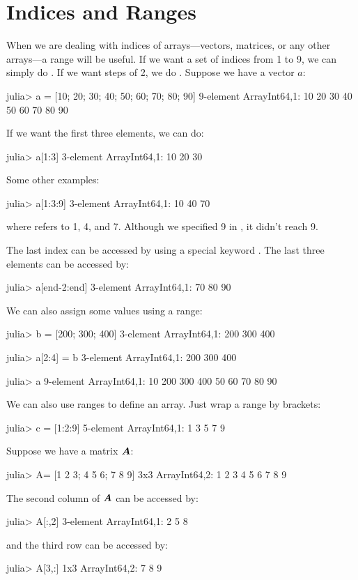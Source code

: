 \section{Indices and Ranges}

When we are dealing with indices of arrays---vectors, matrices, or any other arrays---a range will be useful. If we want a set of indices from 1 to 9, we can simply do . If we want steps of 2, we do . Suppose we have a vector $a$:
\begin{code}
julia> a = [10; 20; 30; 40; 50; 60; 70; 80; 90]
9-element Array{Int64,1}:
 10
 20
 30
 40
 50
 60
 70
 80
 90
\end{code}
\noindent If we want the first three elements, we can do:
\begin{code}
julia> a[1:3]
3-element Array{Int64,1}:
 10
 20
 30
\end{code}
\noindent Some other examples:
\begin{code}
julia> a[1:3:9]
3-element Array{Int64,1}:
 10
 40
 70
\end{code}
\noindent where  refers to 1, 4, and 7. Although we specified 9 in , it didn't reach 9.

The last index can be accessed by using a special keyword . The last three elements can be accessed by:
\begin{code}
julia> a[end-2:end]
3-element Array{Int64,1}:
 70
 80
 90
\end{code}

We can also assign some values using a range:
\begin{code}
julia> b = [200; 300; 400]
3-element Array{Int64,1}:
 200
 300
 400

julia> a[2:4] = b
3-element Array{Int64,1}:
 200
 300
 400

julia> a
9-element Array{Int64,1}:
  10
 200
 300
 400
  50
  60
  70
  80
  90
\end{code}

We can also use ranges to define an array. Just wrap a range by brackets:
\begin{code}
julia> c = [1:2:9]
5-element Array{Int64,1}:
 1
 3
 5
 7
 9
\end{code}

Suppose we have a matrix $\boldsymbol{A}$:
\begin{code}
julia> A= [1 2 3; 4 5 6; 7 8 9]
3x3 Array{Int64,2}:
 1  2  3
 4  5  6
 7  8  9
\end{code}
\noindent The second column of $\boldsymbol{A}$ can be accessed by:
\begin{code}
julia> A[:,2]
3-element Array{Int64,1}:
 2
 5
 8
\end{code}
\noindent and the third row can be accessed by:
\begin{code}
julia> A[3,:]
1x3 Array{Int64,2}:
 7  8  9
\end{code}






